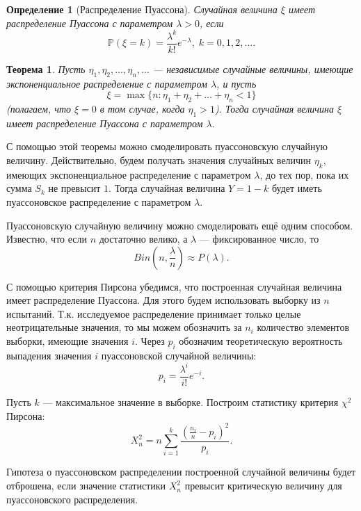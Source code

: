 \documentclass[11pt]{article}
\newtheorem{theorem}{Теорема}
\newtheorem{definition}{Определение}
\begin{document}
\begin{definition}[Распределение Пуассона]
Случайная величина $\xi$ имеет распределение Пуассона с параметром $\lambda > 0$, если
$$
\mathbb{P}(\xi = k) = \frac{\lambda^k}{k!}e^{-\lambda}, \; k = 0, 1, 2, \ldots.
$$
\end{definition}

\begin{theorem}
Пусть $\eta_1, \eta_2, \ldots , \eta_n, \ldots$ --- независимые случайные величины, имеющие экспоненциальное распределение с параметром $\lambda$, и пусть
$$
\xi = \max\{n : \eta_1 + \eta_2 + \ldots + \eta_n < 1\}
$$
(полагаем, что $\xi = 0$ в том случае, когда $\eta_1 > 1$). Тогда случайная величина $\xi$ имеет распределение Пуассона с параметром $\lambda$.
\end{theorem}

С помощью этой теоремы можно смоделировать пуассоновскую случайную величину. Действительно, будем получать значения случайных величин $\eta_k$, имеющих экспоненциальное распределение с параметром $\lambda$, до тех пор, пока их сумма $S_k$ не превысит $1$. Тогда случайная величина $Y=1-k$ будет иметь пуассоновское распределение с параметром $\lambda$.

Пуассоновскую случайную величину можно смоделировать ещё одним способом. Известно, что если $n$ достаточно велико, а $\lambda$ --- фиксированное число, то
$$
Bin\left( n, \frac{\lambda}{n} \right) \approx P(\lambda).
$$

С помощью критерия Пирсона убедимся, что построенная случайная величина имеет распределение Пуассона. Для этого будем использовать выборку из $n$ испытаний. Т.к. исследуемое распределение принимает только целые неотрицательные значения, то мы можем обозначить за $n_i$ количество элементов выборки, имеющие значения $i$. Через $p_i$ обозначим теоретическую вероятность выпадения значения $i$ пуассоновской случайной величины:
$$
p_i = \frac{\lambda^i}{i!}e^{-i}.
$$

Пусть $k$ --- максимальное значение в выборке. Построим статистику критерия $\chi^2$ Пирсона:
$$
X_n^2 = n \sum\limits_{i=1}^k \frac{\left( \frac{n_i}{n} - p_i \right)^2 }{p_i}.
$$

Гипотеза о пуассоновском распределении построенной случайной величины будет отброшена, если значение статистики $X_n^2$ превысит критическую величину для пуассоновского распределения.
\end{document}
